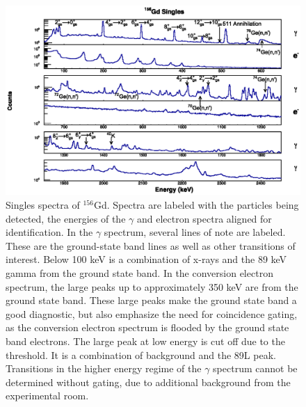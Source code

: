 \begin{figure}[!]
    \centering
    \includegraphics[scale=0.9]{156GdTablesAndFigs/156Gd_Singles_Label.eps}
    \caption{Singles spectra of $^{156}$Gd. Spectra are labeled with the particles being detected, the energies of the $\gamma$ and electron spectra aligned for identification. In the $\gamma$ spectrum, several lines of note are labeled. These are the ground-state band lines as well as other transitions of interest. Below 100 keV is a combination of x-rays and the 89 keV gamma from the ground state band. In the conversion electron spectrum, the large peaks up to approximately 350 keV are from the ground state band. These large peaks make the ground state band a good diagnostic, but also emphasize the need for coincidence gating, as the conversion electron spectrum is flooded by the ground state band electrons. The large peak at low energy is cut off due to the threshold. It is a combination of background and the 89L peak. Transitions in the higher energy regime of the $\gamma$ spectrum cannot be determined without gating, due to additional background from the experimental room.}
    \label{fig:156_Singles}
\end{figure}